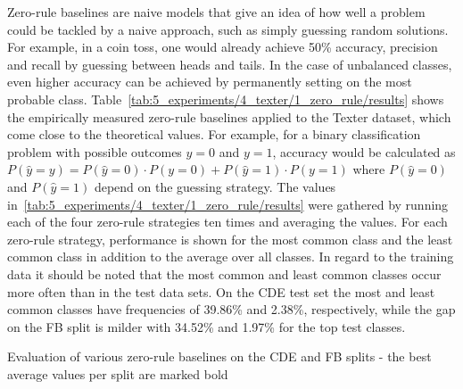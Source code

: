 Zero-rule baselines are naive models that give an idea of how well a problem could be tackled by a naive approach, such as simply guessing random solutions. For example, in a coin toss, one would already achieve 50\% accuracy, precision and recall by guessing between heads and tails. In the case of unbalanced classes, even higher accuracy can be achieved by permanently setting on the most probable class. Table~\ref{tab:5_experiments/4_texter/1_zero_rule/results} shows the empirically measured zero-rule baselines applied to the Texter dataset, which come close to the theoretical values. For example, for a binary classification problem with possible outcomes $y = 0$ and $y = 1$, accuracy would be calculated as $P(\hat{y} = y) = P(\hat{y} = 0) \cdot P(y = 0) + P(\hat{y} = 1) \cdot P(y = 1)$ where $P(\hat{y} = 0)$ and $P(\hat{y} = 1)$ depend on the guessing strategy. The values in~\ref{tab:5_experiments/4_texter/1_zero_rule/results} were gathered by running each of the four zero-rule strategies ten times and averaging the values. For each zero-rule strategy, performance is shown for the most common class and the least common class in addition to the average over all classes. In regard to the training data it should be noted that the most common and least common classes occur more often than in the test data sets. On the CDE test set the most and least common classes have frequencies of 39.86\% and 2.38\%, respectively, while the gap on the FB split is milder with 34.52\% and 1.97\% for the top test classes.

\begin{table}[h]
    \makebox[\textwidth][c]{
        
    }
    \caption{Evaluation of various zero-rule baselines on the CDE and FB splits - the best average values per split are marked bold}
    \label{tab:5_experiments/4_texter/1_zero_rule/results}
\end{table}

